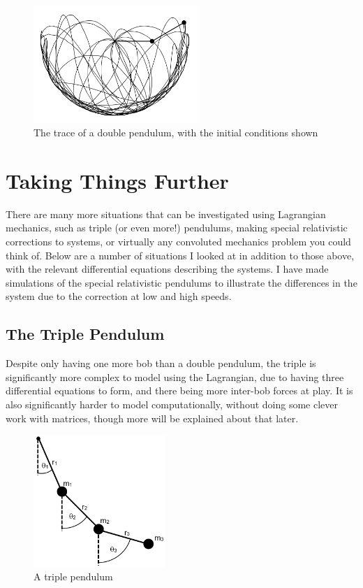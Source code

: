 \documentclass{article}
\begin{document}
\begin{figure}[h!]
\centering
\includegraphics[width=6.25cm]{Double_Pendulum_Trace.jpg}
\caption{The trace of a double pendulum, with the initial conditions shown}
\end{figure}

\section{Taking Things Further}

There are many more situations that can be investigated using Lagrangian mechanics, such as triple (or even more!) pendulums, making special relativistic corrections to systems, or virtually any convoluted mechanics problem you could think of. Below are a number of situations I looked at in addition to those above, with the relevant differential equations describing the systems. I have made simulations of the special relativistic pendulums to illustrate the differences in the system due to the correction at low and high speeds.

\subsection{The Triple Pendulum}

 Despite only having one more bob than a double pendulum, the triple is significantly more complex to model using the Lagrangian, due to having three differential equations to form, and there being more inter-bob forces at play. It is also significantly harder to model computationally, without doing some clever work with matrices, though more will be explained about that later.

\begin{figure}[h!]
\centering
\includegraphics[width=5cm]{Lagrangian_Triple_Pendulum.jpg}
\caption{A triple pendulum}
\end{figure}
\end{document}
